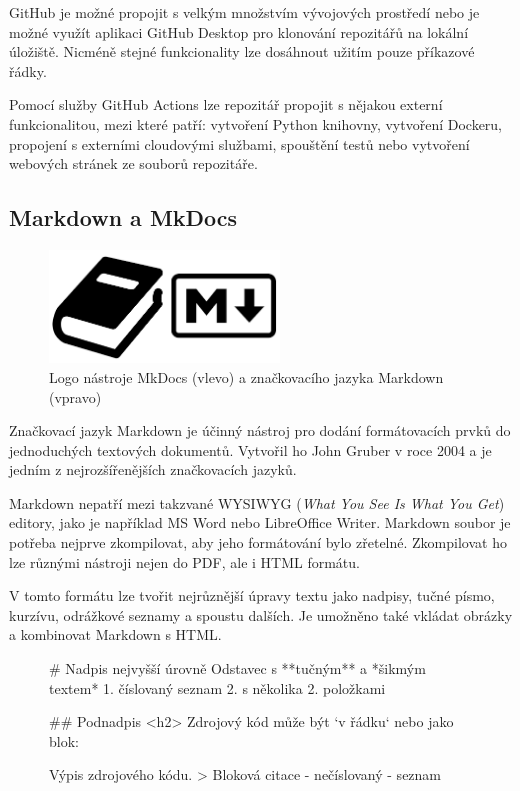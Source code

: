 \documentclass[a4paper,oneside,12pt]{book}
\begin{document}
\hspace{10mm}GitHub je možné propojit s velkým množstvím vývojových prostředí nebo je možné využít aplikaci GitHub Desktop pro klonování repozitářů na lokální úložiště. Nicméně stejné funkcionality lze dosáhnout užitím pouze
příkazové řádky. 

\hspace{10mm}Pomocí služby GitHub Actions lze repozitář propojit s nějakou externí funkcionalitou, mezi které patří: vytvoření Python knihovny, vytvoření Dockeru, propojení s externími cloudovými službami, spouštění testů nebo vytvoření webových stránek ze souborů repozitáře. 
\newpage
\subsection{Markdown a MkDocs} \label{markdown}

\begin{figure}[H] \label{obrmd}
\centering
\includegraphics[height=3cm]{pictures/md.png}
\caption{Logo nástroje MkDocs (vlevo) a značkovacího jazyka Markdown (vpravo) \cite{Guthals2023}}
\label{fig:md}
\end{figure}

\hspace{10mm} Značkovací jazyk Markdown je účinný nástroj pro dodání formátovacích prvků do jednoduchých textových dokumentů. Vytvořil ho John Gruber v roce 2004 a je jedním z nejrozšířenějších značkovacích jazyků. \cite{Cone2020}

\hspace{10mm} Markdown nepatří mezi takzvané WYSIWYG (\textit{What You See Is What You Get}) editory, jako je například MS Word nebo LibreOffice Writer. Markdown soubor je potřeba nejprve zkompilovat, aby jeho formátování bylo zřetelné. Zkompilovat ho lze různými nástroji nejen do PDF, ale i HTML formátu. \cite{Cone2020}

\hspace{10mm}V tomto formátu lze tvořit nejrůznější úpravy textu jako nadpisy, tučné písmo, kurzívu, odrážkové seznamy a spoustu dalších. Je umožněno také vkládat obrázky a kombinovat Markdown s HTML. \cite{Cone2020}

\begin{figure}[H]
\begin{pythoncode}[style=mypython, caption={Ukázka Markdown syntaxe},label={kod:md}]
# Nadpis nejvyšší úrovně
Odstavec s **tučným** a *šikmým textem*
1. číslovaný seznam
2. s několika
2. položkami

## Podnadpis <h2>
Zdrojový kód může být `v řádku` nebo jako blok:

  Výpis zdrojového kódu.
> Bloková citace
- nečíslovaný
- seznam
\end{pythoncode}
\end{figure}
\end{document}
